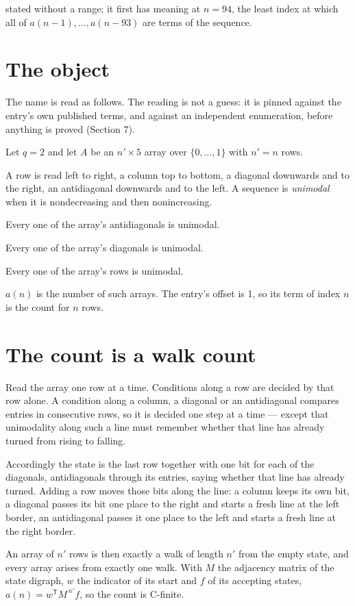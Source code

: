 \documentclass[11pt]{article}
\theoremstyle{definition}
\begin{document}
stated without a range; it first has meaning at $n = 94$, the least index at which all of $a(n-1),\dots,a(n-93)$ are terms of the sequence.

\section{The object}

The name is read as follows. The reading is not a guess: it is pinned against the entry's own published terms, and against an independent enumeration, before anything is proved (Section 7).

Let $q = 2$ and let $A$ be an $n' \times 5$ array over $\{0,\dots,1\}$ with $n' = n$ rows.

A row is read left to right, a column top to bottom, a diagonal downwards and to the right, an antidiagonal downwards and to the left. A sequence is {\itshape unimodal} when it is nondecreasing and then nonincreasing.

Every one of the array's antidiagonals is unimodal.

Every one of the array's diagonals is unimodal.

Every one of the array's rows is unimodal.

$a(n)$ is the number of such arrays. The entry's offset is 1, so its term of index $n$ is the count for $n$ rows.

\section{The count is a walk count}

Read the array one row at a time. Conditions along a row are decided by that row alone. A condition along a column, a diagonal or an antidiagonal compares entries in consecutive rows, so it is decided one step at a time --- except that unimodality along such a line must remember whether that line has already turned from rising to falling.

Accordingly the state is the last row together with one bit for each of the diagonals, antidiagonals through its entries, saying whether that line has already turned. Adding a row moves those bits along the line: a column keeps its own bit, a diagonal passes its bit one place to the right and starts a fresh line at the left border, an antidiagonal passes it one place to the left and starts a fresh line at the right border.

An array of $n'$ rows is then exactly a walk of length $n'$ from the empty state, and every array arises from exactly one walk. With $M$ the adjacency matrix of the state digraph, $w$ the indicator of its start and $f$ of its accepting states, $a(n) = w^{\mathsf T}M^{\,n'}f$, so the count is C-finite.
\end{document}
